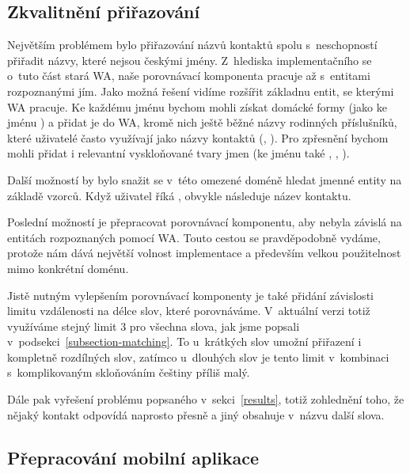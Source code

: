 \subsection{Zkvalitnění přiřazování}\label{better-match}

Největším problémem bylo přiřazování názvů kontaktů spolu s~neschopností přiřadit
názvy, které nejsou českými jmény. Z~hlediska implementačního se o~tuto část
stará WA, naše porovnávací komponenta pracuje až s~entitami rozpoznanými jím.
Jako možná řešení vidíme rozšířit základnu entit, se kterými WA pracuje. Ke
každému jménu bychom mohli získat domácké formy (jako  ke jménu )
a přidat je do WA, kromě nich ještě běžné názvy rodinných příslušníků,
které uživatelé často využívají jako názvy kontaktů (, ).
Pro zpřesnění bychom mohli přidat i relevantní vyskloňované tvary jmen (ke jménu 
také , , ).

Další možností by bylo snažit se v~této omezené doméně hledat jmenné entity na
základě vzorců. Když uživatel říká , obvykle následuje název
kontaktu.

Poslední možností je přepracovat porovnávací komponentu, aby nebyla závislá
na entitách rozpoznaných pomocí WA. Touto cestou se pravděpodobně vydáme,
protože nám dává největší volnost implementace a především velkou
použitelnost mimo konkrétní doménu.

Jistě nutným vylepšením porovnávací komponenty je také přidání závislosti
limitu vzdálenosti na délce slov, které porovnáváme. V~aktuální verzi
totiž využíváme stejný limit 3 pro všechna slova, jak jsme popsali
v~podsekci~\ref{subsection-matching}. To u~krátkých slov umožní
přiřazení i kompletně rozdílných slov, zatímco u~dlouhých
slov je tento limit v~kombinaci s~komplikovaným skloňováním češtiny
příliš malý.

Dále pak vyřešení problému popsaného v~sekci~\ref{results}, totiž zohlednění
toho, že nějaký kontakt odpovídá naprosto
přesně a jiný obsahuje v~názvu další slova.

\subsection{Přepracování mobilní aplikace}\label{better-app}

